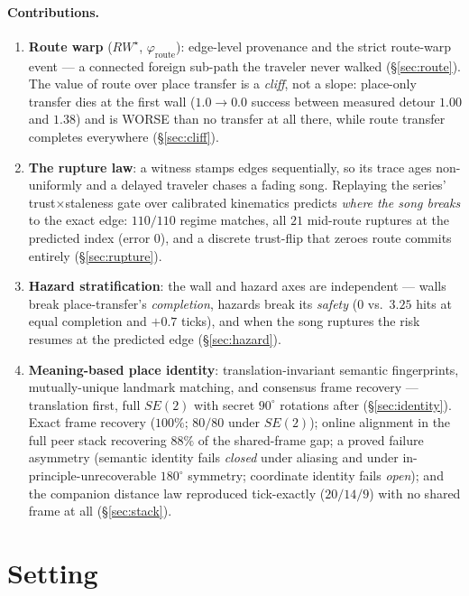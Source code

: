 \documentclass{article}
\newcommand{\rwstar}{RW^{\star}}
\newcommand{\phiroute}{\varphi_{\mathrm{route}}}
\begin{document}
\paragraph{Contributions.}
\begin{enumerate}[leftmargin=20pt,itemsep=2pt,topsep=2pt]
\item \textbf{Route warp} ($\rwstar$, $\phiroute$): edge-level
  provenance and the strict route-warp event --- a connected foreign
  sub-path the traveler never walked (\S\ref{sec:route}). The value of
  route over place transfer is a \emph{cliff}, not a slope: place-only
  transfer dies at the first wall ($1.0 \to 0.0$ success between
  measured detour $1.00$ and $1.38$) and is WORSE than no transfer at
  all there, while route transfer completes everywhere
  (\S\ref{sec:cliff}).
\item \textbf{The rupture law}: a witness stamps edges sequentially,
  so its trace ages non-uniformly and a delayed traveler chases a
  fading song. Replaying the series' trust$\times$staleness gate over
  calibrated kinematics predicts \emph{where the song breaks} to the
  exact edge: $110/110$ regime matches, all $21$ mid-route ruptures at
  the predicted index (error $0$), and a discrete trust-flip that
  zeroes route commits entirely (\S\ref{sec:rupture}).
\item \textbf{Hazard stratification}: the wall and hazard axes are
  independent --- walls break place-transfer's \emph{completion},
  hazards break its \emph{safety} ($0$ vs.\ $3.25$ hits at equal
  completion and $+0.7$ ticks), and when the song ruptures the risk
  resumes at the predicted edge (\S\ref{sec:hazard}).
\item \textbf{Meaning-based place identity}: translation-invariant
  semantic fingerprints, mutually-unique landmark matching, and
  consensus frame recovery --- translation first, full $SE(2)$ with
  secret $90^\circ$ rotations after (\S\ref{sec:identity}). Exact
  frame recovery ($100\%$; $80/80$ under $SE(2)$); online alignment in
  the full peer stack recovering $88\%$ of the shared-frame gap; a
  proved failure asymmetry (semantic identity fails \emph{closed}
  under aliasing and under in-principle-unrecoverable $180^\circ$
  symmetry; coordinate identity fails \emph{open}); and the companion
  distance law reproduced tick-exactly ($20/14/9$) with no shared
  frame at all (\S\ref{sec:stack}).
\end{enumerate}

\section{Setting}
\label{sec:setting}
\end{document}
